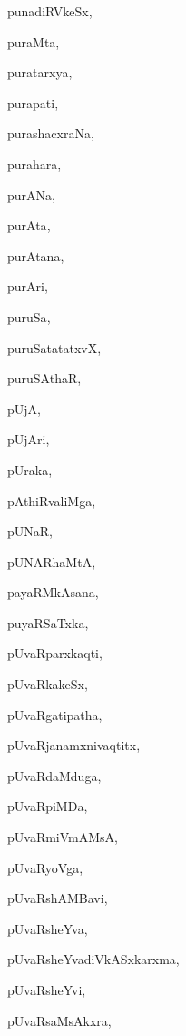 \begin{multicols}{2}
{punadiRVkeSx}, \pageref{punadiRVkeSx}

{puraMta}, \pageref{puraMta}

{puratarxya}, \pageref{puratarxya}

{purapati}, \pageref{purapati}

{purashacxraNa}, \pageref{purashacxraNa}

{purahara}, \pageref{purahara}

{purANa}, \pageref{purANa}

{purAta}, \pageref{purAta}

{purAtana}, \pageref{purAtana}

{purAri}, \pageref{purAri}

{puruSa}, \pageref{puruSa}

{puruSatatatxvX}, \pageref{puruSatatatxvX}

{puruSAthaR}, \pageref{puruSAthaR}

{pUjA}, \pageref{pUjA}

{pUjAri}, \pageref{pUjAri}

{pUraka}, \pageref{pUraka}

{pAthiRvaliMga}, \pageref{pAthiRvaliMga}

{pUNaR}, \pageref{pUNaR}

{pUNARhaMtA}, \pageref{pUNARhaMtA}

{payaRMkAsana}, \pageref{payaRMkAsana}

{puyaRSaTxka}, \pageref{puyaRSaTxka}

{pUvaRparxkaqti}, \pageref{pUvaRparxkaqti}

{pUvaRkakeSx}, \pageref{pUvaRkakeSx}

{pUvaRgatipatha}, \pageref{pUvaRgatipatha}

{pUvaRjanamxnivaqtitx}, \pageref{pUvaRjanamxnivaqtitx}

{pUvaRdaMduga}, \pageref{pUvaRdaMduga}

{pUvaRpiMDa}, \pageref{pUvaRpiMDa}

{pUvaRmiVmAMsA}, \pageref{pUvaRmiVmAMsA}

{pUvaRyoVga}, \pageref{pUvaRyoVga}

{pUvaRshAMBavi}, \pageref{pUvaRshAMBavi}

{pUvaRsheYva}, \pageref{pUvaRsheYva}

{pUvaRsheYvadiVkASxkarxma}, \pageref{pUvaRsheYvadiVkASxkarxma}

{pUvaRsheYvi}, \pageref{pUvaRsheYvi}

{pUvaRsaMsAkxra}, \pageref{pUvaRsaMsAkxra}


\end{multicols}
